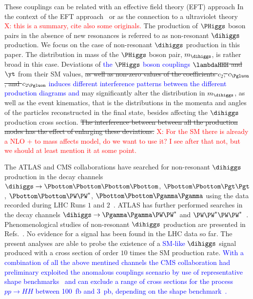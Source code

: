 These couplings can be related with an effective field theory (EFT) approach
In the context of the EFT approach~\cite{Buchalla:2015wfa, Goertz:2014qta} or as the connection to a ultraviolet theory~\cite{Carvalho:2017vnu} \textcolor{red}{X: this is a summary, cite also some originals.} The production of $\PHiggs$ boson pairs in the absence of new resonances is referred to as non-resonant $\dihiggs$ production.
We focus on the case of non-resonant $\dihiggs$ production in this paper.
The distribution in mass of the $\PHiggs$ boson pair, $m_{\dihiggs}$, is rather broad in this case.
Deviations of  \textcolor{blue}{the $\PHiggs$ boson couplings } \st{$\lambdaHHH$ and $\yt$} from their SM values,
\st{as well as non-zero values of the coefficients $c_{2}$, $c_{\Pgluon}$, and $c_{2\Pgluon}$}
\textcolor{blue}{ induces different interference patterns between the different production diagrams and} may  significantly alter the distribution in $m_{\dihiggs}$,
as well as the event kinematics,
that is the distributions in the momenta and angles of the particles reconstructed in the final state,
besides affecting the $\dihiggs$ production cross section.
\st{The interference between  between all the production modes  has the effect of enlarging these deviations.}
 \textcolor{red}{X: For the SM there is already a NLO + to mass affects model, do we want to use it? I see after that not, but we should at least mention it at some point.}

The ATLAS and CMS collaborations have searched for non-resonant $\dihiggs$ production in the decay channels 
$\dihiggs \to \Pbottom\Pbottom\Pbottom\Pbottom$, $\Pbottom\Pbottom\Pgt\Pgt$, $\Pbottom\Pbottom\PW\PW^{*}$, $\Pbottom\Pbottom\Pgamma\Pgamma$
using the data recorded during LHC Runs $1$ and $2$~\cite{HIG-13-032,HIG-15-013,HIG-17-030,Aad:2015xja,Aaboud:2018knk,Aaboud:2018ftw,Aaboud:2018sfw,Aaboud:2018zhh}.
ATLAS has further performed searches in the decay channels $\dihiggs \to \Pgamma\Pgamma\PW\PW^{*}$ and $\PW\PW^{*}\PW\PW^{*}$~\cite{Aad:2015xja,Aaboud:2018ewm,Aaboud:2018ksn}.
Phenomenological studies of non-resonant $\dihiggs$ production are presented in 
Refs.~\cite{Baur:2002rb,Baur:2002qd,Baur:2003gpa,Baur:2003gp,Dolan:2012rv,Papaefstathiou:2012qe,Baglio:2012np,deLima:2014dta,Wardrope:2014kya,Behr:2015oqq,Li:2015yia,Adhikary:2017jtu}.
No evidence for a signal has been found in the LHC data so far.
The present analyses are able to probe the existence of a \textcolor{blue}{SM-like} $\dihiggs$ signal produced with a cross section of order $10$ times the SM production rate.  \textcolor{blue}{With a combination of all the above mentined channels the CMS collaboration had preliminary exploited the anomalous couplings scenario by use of representative shape benchmarks~\cite{Carvalho:2015ttv} and can exclude a range of cross sections for the process $pp\to HH$ between 100~fb and 3~pb, depending on the shape benchmark~\cite{Sirunyan:2018two}.}

